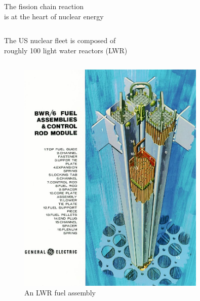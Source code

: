 \documentclass{beamer}
\begin{document}
\begin{frame}{The fission chain reaction \\ is at the heart of nuclear energy}
\begin{columns}[T]
            \end{columns}

        \end{frame}

        \begin{frame}{The US nuclear fleet is composed of \\ roughly 100 light water reactors (LWR)}

            \begin{columns}[T]

                \begin{column}{0.5\textwidth}
                    \begin{figure}
                        \centering
                        \includegraphics[width=0.8\textwidth]{./img/bwrFuel.png}
                        \caption*{An LWR fuel assembly}
                    \end{figure}
                \end{column}


\end{columns}
\end{frame}
\end{document}
